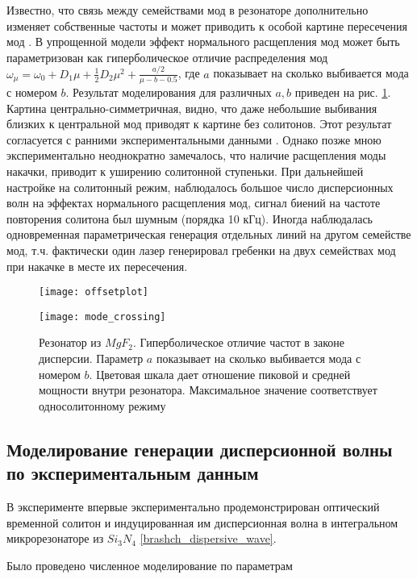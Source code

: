Известно, что связь между семействами мод в резонаторе дополнительно изменяет собственные частоты и может приводить к особой картине пересечения мод \cite{HerrPRL2014}. В упрощенной модели эффект нормального расщепления мод может быть параметризован как гиперболическое отличие распределения мод $\omega_\mu=\omega_0+D_1\mu+\frac{1}{2}D_2\mu^2+\frac{a/2}{\mu-b-0.5}$, где $a$ показывает на сколько выбивается мода с номером $b$. Результат моделирования для различных $a,b$ приведен на рис. \ref{offsetplot}. Картина центрально-симметричная, видно, что даже небольшие выбивания близких к центральной мод приводят к картине без солитонов. Этот результат согласуется с ранними экспериментальными данными \cite{HerrPRL2014}. Однако позже мною экспериментально неоднократно замечалось, что наличие расщепления моды накачки, приводит к уширению солитонной ступеньки. При дальнейшей настройке на солитонный режим, наблюдалось большое число дисперсионных волн на эффектах нормального расщепления мод, сигнал биений на частоте повторения солитона был шумным (порядка 10 кГц). Иногда наблюдалась одновременная параметрическая генерация отдельных линий на другом семействе мод, т.ч. фактически один лазер генерировал гребенки на двух семействах мод при накачке в месте их пересечения.

\begin{figure}
  \centering
  \texttt{[image: offsetplot]}

  \texttt{[image: mode\_crossing]}
  \caption{Резонатор из $MgF_2$. Гиперболическое отличие частот в законе дисперсии. Параметр $a$ показывает на сколько выбивается мода с номером $b$. Цветовая шкала дает отношение пиковой и средней мощности внутри резонатора. Максимальное значение соответствует односолитонному режиму} \label{offsetplot}
\end{figure}

\subsection{Моделирование генерации дисперсионной волны по экспериментальным данным}

В эксперименте \cite{Brasch2016} впервые экспериментально продемонстрирован оптический временной солитон и индуцированная им дисперсионная волна в интегральном микрорезонаторе из $Si_3N_4$ \ref{brashch_dispersive_wave}.

Было проведено численное моделирование по параметрам 

